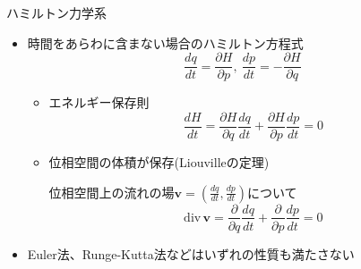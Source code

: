 \begin{frame}[t,fragile]{ハミルトン力学系}
  \begin{itemize}
  \item 時間をあらわに含まない場合のハミルトン方程式
    \[
    \frac{dq}{dt} = \frac{\partial H}{\partial p}, \ \frac{dp}{dt} = -\frac{\partial H}{\partial q}
    \]
    \begin{itemize}
    \item エネルギー保存則
      \[
      \frac{dH}{dt} = \frac{\partial H}{\partial q} \frac{dq}{dt} + \frac{\partial H}{\partial p} \frac{dp}{dt} = 0
      \]
    \item 位相空間の体積が保存(Liouvilleの定理)

      位相空間上の流れの場$\bm{v} = (\frac{dq}{dt},\frac{dp}{dt})$について
      \[
      \text{div} \, \bm{v} = \frac{\partial}{\partial q} \frac{dq}{dt} + \frac{\partial}{\partial p} \frac{dp}{dt} = 0
      \]
    \end{itemize}
  \item Euler法、Runge-Kutta法などはいずれの性質も満たさない
  \end{itemize}
\end{frame}
